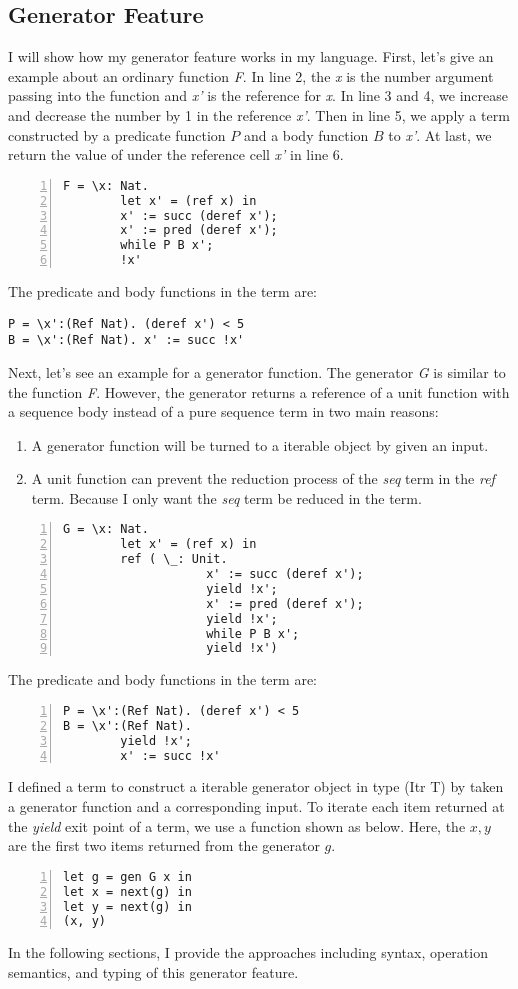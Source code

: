 \subsection{Generator Feature}
I will show how my generator feature works in my language. First, let's give an example about an ordinary function \textit{F}. In line 2, the \textit{x} is the number argument passing into the function and \textit{x'} is the reference for \textit{x}. In line 3 and 4, we increase and decrease the number by 1 in the reference \textit{x'}. Then in line 5, we apply a \while term constructed by a predicate function $P$ and a body function $B$ to \textit{x'}. At last, we return the value of under the reference cell \textit{x'} in line 6.
\begin{lstlisting}[basicstyle=\small, numbers=left]
F = \x: Nat.
		let x' = (ref x) in 
		x' := succ (deref x');
		x' := pred (deref x');
		while P B x';
		!x'
\end{lstlisting}
The predicate and body functions in the \while term are: 
\begin{lstlisting}[basicstyle=\small]
P = \x':(Ref Nat). (deref x') < 5
B = \x':(Ref Nat). x' := succ !x'
\end{lstlisting}
Next, let's see an example for a generator function. The generator \textit{G} is similar to the function \textit{F}. However, the generator returns a reference of a unit function with a sequence body instead of a pure sequence term in two main reasons:
\begin{enumerate}
	\item A generator function will be turned to a iterable object by given an input.
	\item A unit function can prevent the reduction process of the \textit{seq} term in the \textit{ref} term. Because I only want the \textit{seq} term be reduced in the \nt term. 
\end{enumerate}
\begin{lstlisting}[basicstyle=\small, numbers=left]
G = \x: Nat.
		let x' = (ref x) in 
		ref ( \_: Unit.
					x' := succ (deref x');
					yield !x';
					x' := pred (deref x');
					yield !x';
					while P B x';
					yield !x')
\end{lstlisting}
The predicate and body functions in the \while term are:
\begin{lstlisting}[basicstyle=\small, numbers=left]
P = \x':(Ref Nat). (deref x') < 5
B = \x':(Ref Nat). 
		yield !x'; 
		x' := succ !x'
\end{lstlisting}
I defined a \gen term to construct a iterable generator object in type (Itr T) by taken a generator function and a corresponding input. To iterate each item returned at the \textit{yield} exit point of a \gen term, we use a \nt function shown as below. Here, the $x, y$ are the first two items returned from the generator $g$.
\begin{lstlisting}[basicstyle=\small, numbers=left]
let g = gen G x in 
let x = next(g) in
let y = next(g) in
(x, y)
\end{lstlisting}
In the following sections, I provide the approaches including syntax, operation semantics, and typing of this generator feature. 